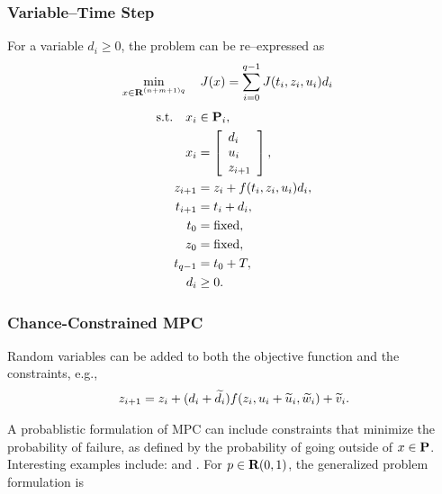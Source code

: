 \documentclass{article}
\begin{document}
\subsubsection{Variable--Time Step}

    For a variable $d_i\geq0$, the problem can be re--expressed as
    \begin{align*}
        \min_{x\in\textbf{R}^{(n+m+1)q}}\quad J(x)&=\sum_{i=0}^{q-1}  J (t_i,z_i,u_i) d_i
    \end{align*}
    \begin{align*}
        \text{s.t.}\quad x_i&\in\textbf{P}_i,\\
        x_i&=\left[\begin{array}{lllllllllllllllllll}d_i\\u_i\\z_{i+1}\end{array}\right],\\
        z_{i+1} &= z_i+f(t_i,z_i,u_i)d_i,\\
        t_{i+1} &=t_i + d_i,\\
        t_{0}&=\text{fixed},\\
        z_{0}&=\text{fixed},\\
        t_{q-1}&=t_0+T,\\
        d_i&\geq 0.
    \end{align*}


    \clearpage

\subsubsection{Chance-Constrained MPC}

    Random variables can be added to both the objective function and the constraints, e.g.,
    \begin{align*}
        z_{i+1} = z_i+(d_i+\widetilde{d}_i)f(z_i,u_i+\widetilde{u}_i,\widetilde{w}_i)+\widetilde{v}_i.
    \end{align*}

    A probablistic formulation of MPC can include 
    constraints that minimize the probability of failure, 
    as defined by the probability of going outside of $x\in\textbf{P}$.
    Interesting examples include: \cite{chance} and  \cite{chance2}.
    For $p\in\textbf{R}(0,1)$, the generalized problem formulation is
\end{document}
